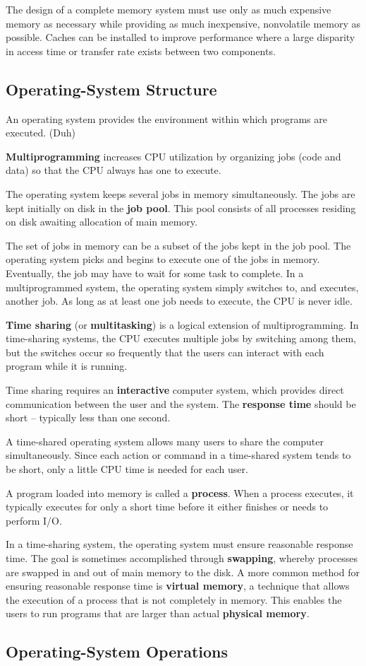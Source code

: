 \documentclass[]{article}
\begin{document}
The design of a complete memory system must use only as much expensive memory as
necessary while providing as much inexpensive, nonvolatile memory as possible.
Caches can be installed to improve performance where a large disparity in access
time or transfer rate exists between two components.

\subsection*{Operating-System Structure}
An operating system provides the environment within which programs are executed.
(Duh)

\textbf{Multiprogramming} increases CPU utilization by organizing jobs (code and
data) so that the CPU always has one to execute.

The operating system keeps several jobs in memory simultaneously. The jobs are
kept initially on disk in the \textbf{job pool}. This pool consists of all
processes residing on disk awaiting allocation of main memory.

The set of jobs in memory can be a subset of the jobs kept in the job pool. The
operating system picks and begins to execute one of the jobs in memory.
Eventually, the job may have to wait for some task to complete. In a
multiprogrammed system, the operating system simply switches to, and executes,
another job. As long as at least one job needs to execute, the CPU is never
idle.

\textbf{Time sharing} (or \textbf{multitasking}) is a logical extension of
multiprogramming. In time-sharing systems, the CPU executes multiple jobs by
switching among them, but the switches occur so frequently that the users can
interact with each program while it is running.

Time sharing requires an \textbf{interactive} computer system, which provides
direct communication between the user and the system. The \textbf{response time}
should be short -- typically less than one second.

A time-shared operating system allows many users to share the computer
simultaneously. Since each action or command in a time-shared system tends to be
short, only a little CPU time is needed for each user.

A program loaded into memory is called a \textbf{process}. When a process
executes, it typically executes for only a short time before it either finishes
or needs to perform I/O.

In a time-sharing system, the operating system must ensure reasonable response
time. The goal is sometimes accomplished through \textbf{swapping}, whereby
processes are swapped in and out of main memory to the disk. A more common
method for ensuring reasonable response time is \textbf{virtual memory}, a
technique that allows the execution of a process that is not completely in
memory. This enables the users to run programs that are larger than actual
\textbf{physical memory}.

\subsection*{Operating-System Operations}
\end{document}

